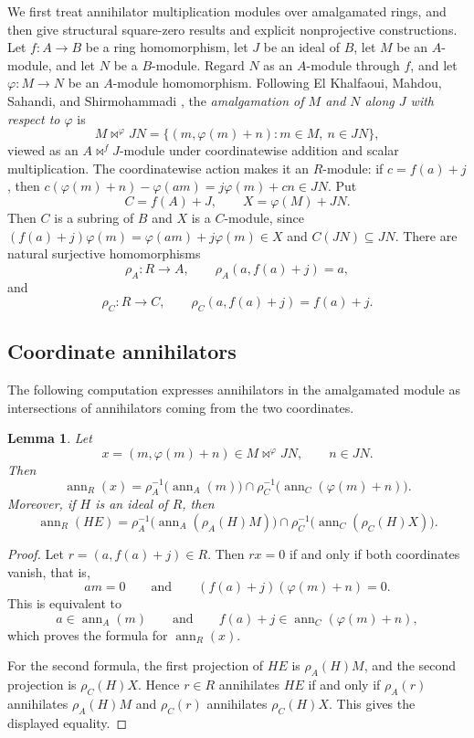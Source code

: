 \documentclass[11pt]{amsart}
\theoremstyle{plain}
\newtheorem{lemma}[theorem]{Lemma}
\theoremstyle{definition}
\theoremstyle{remark}
\newcommand{\ann}{\operatorname{ann}}
\numberwithin{equation}{section}
\begin{document}
We first treat annihilator multiplication modules over amalgamated rings,
and then give structural square-zero results and explicit nonprojective
constructions. Let $f:A\to B$ be a ring homomorphism, let $J$ be an ideal of $B$,
let $M$ be an $A$-module, and let $N$ be a $B$-module.
Regard $N$ as an $A$-module through $f$, and let
$\varphi:M\to N$ be an $A$-module homomorphism.
Following El Khalfaoui, Mahdou, Sahandi, and Shirmohammadi
\cite{ElKhalfaouiEtAl2021}, the \emph{amalgamation of $M$ and $N$
along $J$ with respect to $\varphi$} is
\[
M\bowtie^\varphi JN
=
\{(m,\varphi(m)+n):m\in M,\ n\in JN\},
\]
viewed as an $A\bowtie^fJ$-module under coordinatewise addition
and scalar multiplication.
The coordinatewise action makes it an $R$-module: if $c=f(a)+j$, then
$c(\varphi(m)+n)-\varphi(am)=j\varphi(m)+cn\in JN$.
Put
\[
C=f(A)+J, \qquad X=\varphi(M)+JN.
\]
Then $C$ is a subring of $B$ and $X$ is a $C$-module, since
$(f(a)+j)\varphi(m)=\varphi(am)+j\varphi(m)\in X$ and $C(JN)\subseteq JN$.
There are natural
surjective homomorphisms
\[
\rho_A:R\longrightarrow A, \qquad \rho_A(a,f(a)+j)=a,
\]
and
\[
\rho_C:R\longrightarrow C, \qquad \rho_C(a,f(a)+j)=f(a)+j.
\]

\subsection{Coordinate annihilators}

The following computation expresses annihilators in the amalgamated module as
intersections of annihilators coming from the two coordinates.

\begin{lemma}
\label{lem:amalgamated-annihilator}
Let
\[
x=(m,\varphi(m)+n)\in M\bowtie^\varphi JN, \qquad n\in JN.
\]
Then
\[
\ann_R(x) =\rho_A^{-1}\bigl(\ann_A(m)\bigr) \cap \rho_C^{-1}\bigl(\ann_C(\varphi(m)+n)\bigr).
\]
Moreover, if $H$ is an ideal of $R$, then
\[
\ann_R(HE) =\rho_A^{-1}\bigl(\ann_A(\rho_A(H)M)\bigr) \cap \rho_C^{-1}\bigl(\ann_C(\rho_C(H)X)\bigr).
\]
\end{lemma}

\begin{proof}
Let $r=(a,f(a)+j)\in R$. Then $rx=0$ if and only if both coordinates vanish,
that is,
\[
am=0 \qquad\text{and}\qquad (f(a)+j)(\varphi(m)+n)=0.
\]
This is equivalent to
\[
a\in\ann_A(m) \qquad\text{and}\qquad f(a)+j\in\ann_C(\varphi(m)+n),
\]
which proves the formula for $\ann_R(x)$.

For the second formula, the first projection of $HE$ is $\rho_A(H)M$, and the
second projection is $\rho_C(H)X$. Hence $r\in R$ annihilates $HE$ if and only
if $\rho_A(r)$ annihilates $\rho_A(H)M$ and $\rho_C(r)$ annihilates
$\rho_C(H)X$. This gives the displayed equality.
\end{proof}
\end{document}
